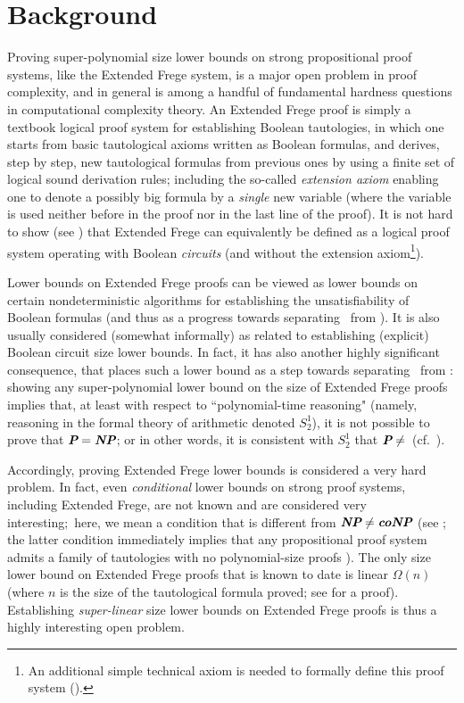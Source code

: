 \documentclass[12pt,reqno]{article}
\newcommand{\iddofix}[2][]
{\todo[inline, size=\footnotesize, caption={#2}, #1, linecolor=green!70!white,         backgroundcolor=red!30!white,bordercolor=white]
{{#2}}}
\begin{document}
\section{Background}
Proving super-polynomial size lower bounds on strong propositional proof systems, like the Extended Frege system, is a major open problem in proof complexity, and in general is among a handful of fundamental hardness questions in computational complexity theory. An Extended Frege proof is simply a textbook logical proof system for establishing Boolean tautologies, in which one starts from basic tautological axioms written as Boolean formulas,  and derives, step by step, new tautological formulas from previous ones by using a finite set of logical sound derivation rules; including  the so-called \textit{extension axiom} enabling  one to denote a possibly big formula by a \textit{single }new variable (where the variable is used neither before in the proof nor in the last line of the proof). It is not hard to show (see \cite{Jer04}) that Extended Frege can equivalently be defined as a logical proof system operating with Boolean \emph{circuits} (and without the extension axiom\footnote{An additional simple technical axiom is needed to formally define this proof system (\cite{Jer04}).}).


Lower bounds on Extended Frege proofs can be viewed as lower bounds on certain nondeterministic algorithms for establishing the unsatisfiability of Boolean formulas (and thus as a progress towards separating \NP\ from \coNP). It is also usually considered (somewhat informally) as related to establishing (explicit) Boolean circuit size lower bounds. In fact,  it has also another highly significant consequence, that places such a lower bound as a  step towards separating \Ptime\ from \NP: showing any super-polynomial lower bound on the size of Extended Frege proofs implies that, at least with respect to ``polynomial-time reasoning" (namely, reasoning in the formal theory of arithmetic denoted $S^1_2$), it is not possible to prove that $\textit{\textbf{P}}={\textit{\textbf{NP}}}$; or in other words, it is consistent with $S^1_2$ that $\textit{\textbf{P}}\neq$\NP\ (cf.~\cite{KP89}).


Accordingly, proving Extended Frege lower bounds is considered a very hard problem. In fact, even \emph{conditional} lower bounds on strong proof systems, including  Extended Frege, are not known and are considered very interesting;\footnotemark \ here, we mean  a condition that is  different from ${\textit{\textbf{NP}}}\neq\textit{\textbf{coNP}}$ (see \cite{Pud08};  the latter condition immediately  implies that any propositional proof system admits a family of tautologies with no polynomial-size proofs \cite{CR79}). The only size lower bound on Extended Frege proofs that is known to date is linear $\Omega(n)$ (where $n$ is the size of the tautological formula proved; see \cite{Kra95} for a proof).
Establishing \textit{super-linear }size lower bounds on Extended Frege proofs is thus a highly interesting open problem.
\end{document}
